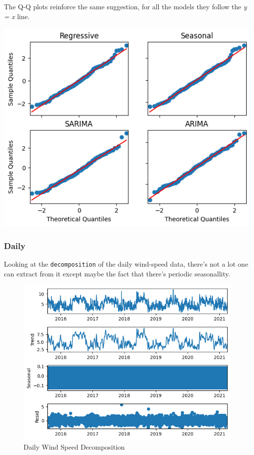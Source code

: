 \documentclass[a4paper,12pt]{article}
\begin{document}
The Q-Q plots reinforce the same suggestion, for all the models they follow the \emph{y = x} line.

\begin{center}
\includegraphics[width=0.8\linewidth]{./images/tiru/weeklyQQ.png}
\end{center}

\pagebreak
\subsubsection{Daily}
\label{sec:org8401fdc}
Looking at the \texttt{decomposition} of the daily wind-speed data, there's not a lot one can extract from it except maybe the fact that there's periodic seasonallity.

\begin{figure}[htbp]
\centering
\includegraphics[width=1.0\textwidth]{./images/tiru/dailyDecomp.png}
Daily Wind Speed Decomposition
\end{figure}
\end{document}
